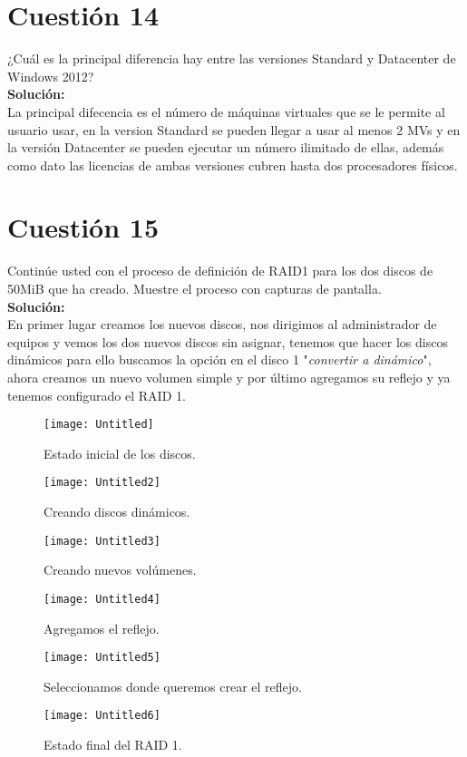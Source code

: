 \documentclass[a4paper, 11pt]{article} %
\begin{document}
\section{Cuestión 14}
¿Cuál es la principal diferencia hay entre las versiones Standard y Datacenter de Windows 2012?\\
\textbf{Solución:}\\
La principal difecencia es el número de máquinas virtuales que se le permite al usuario usar, en la version Standard se pueden llegar a usar al menos 2 MVs y en la versión Datacenter se pueden ejecutar un número ilimitado de ellas, además como dato las licencias de ambas versiones cubren hasta dos procesadores físicos.
\section{Cuestión 15}
Continúe usted con el proceso de definición de RAID1 para los dos discos de 50MiB que ha creado. Muestre el proceso con capturas de pantalla.\\
\textbf{Solución:}\\
En primer lugar creamos los nuevos discos, nos dirigimos al administrador de equipos y vemos los dos nuevos discos sin asignar, tenemos que hacer los discos dinámicos para ello buscamos la opción en el disco 1 "\textit{convertir a dinámico}", ahora creamos un nuevo volumen simple  y por último agregamos su reflejo y ya tenemos configurado el RAID 1.

\begin{figure}[h]
\centering 
\texttt{[image: Untitled]} 
\caption{Estado inicial de los discos.} 
\vspace{-0.5cm}
\label{contexto:figura} 
\end{figure}
\begin{figure}[h]
\centering 
\texttt{[image: Untitled2]} 
\caption{Creando discos dinámicos.} 
\vspace{-0.2cm}
\label{contexto:figura} 
\end{figure}
\begin{figure}[h]
\centering 
\texttt{[image: Untitled3]} 
\caption{Creando nuevos volúmenes.} 
\label{contexto:figura} 
\end{figure}
\begin{figure}[h]
\centering 
\texttt{[image: Untitled4]} 
\caption{Agregamos el reflejo.} 
\vspace{-0.2cm}
\label{contexto:figura} 
\end{figure}
\begin{figure}[h]
\centering 
\texttt{[image: Untitled5]} 
\caption{Seleccionamos donde queremos crear el reflejo.}
\vspace{-0.2cm} 
\label{contexto:figura} 
\end{figure}
\begin{figure}[h]
\centering 
\texttt{[image: Untitled6]} 
\caption{Estado final del RAID 1.}
\vspace{-0.2cm} 
\label{contexto:figura} 
\end{figure}
\end{document}
